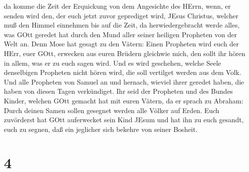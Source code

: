 da komme die Zeit der Erquickung von dem Angesichte des HErrn, wenn, er
senden wird den, der euch jetzt zuvor geprediget wird, JEsus Christus,
 welcher muß den Himmel einnehmen bis auf die Zeit, da
herwiedergebracht werde alles, was GOtt geredet hat durch den Mund aller
seiner heiligen Propheten von der Welt an.  Denn Mose hat
gesagt zu den Vätern: Einen Propheten wird euch der HErr, euer GOtt,
erwecken aus euren Brüdern gleichwie mich, den sollt ihr hören in allem,
was er zu euch sagen wird.  Und es wird geschehen, welche
Seele denselbigen Propheten nicht hören wird, die soll vertilget werden
aus dem Volk.  Und alle Propheten von Samuel an und
hernach, wieviel ihrer geredet haben, die haben von diesen Tagen
verkündiget.  Ihr seid der Propheten und des Bundes Kinder,
welchen GOtt gemacht hat mit euren Vätern, da er sprach zu Abraham:
Durch deinen Samen sollen gesegnet werden alle Völker auf Erden.
 Euch zuvörderst hat GOtt auferwecket sein Kind JEsum und
hat ihn zu euch gesandt, euch zu segnen, daß ein jeglicher sich bekehre
von seiner Bosheit.

\hypertarget{section-3}{%
\section{4}\label{section-3}}

